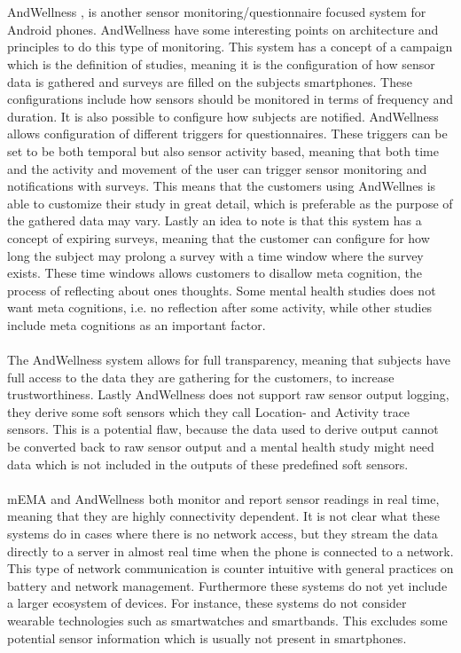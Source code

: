 \\\\
AndWellness \parencite{hicks2010andwellness}, is another sensor monitoring/questionnaire focused system for Android phones. AndWellness have some interesting points on architecture and principles to do this type of monitoring. This system has a concept of a campaign which is the definition of studies, meaning it is the configuration of how sensor data is gathered and surveys are filled on the subjects smartphones. These configurations include how sensors should be monitored in terms of frequency and duration. It is also possible to configure how subjects are notified. AndWellness allows configuration of different triggers for questionnaires. These triggers can be set to be both temporal but also sensor activity based, meaning that both time and the activity and movement of the user can trigger sensor monitoring and notifications with surveys. This means that the customers using AndWellnes is able to customize their study in great detail, which is preferable as the purpose of the gathered data may vary. Lastly an idea to note is that this system has a concept of expiring surveys, meaning that the customer can configure for how long the subject may prolong a survey with a time window where the survey exists. These time windows allows customers to disallow meta cognition, the process of reflecting about ones thoughts. Some mental health studies does not want meta cognitions, i.e. no reflection after some activity, while other studies include meta cognitions as an important factor. 
\\\\
The AndWellness system allows for full transparency, meaning that subjects have full access to the data they are gathering for the customers, to increase trustworthiness. Lastly AndWellness does not support raw sensor output logging, they derive some soft sensors which they call Location- and Activity trace sensors. This is a potential flaw, because the data used to derive output cannot be converted back to raw sensor output and a mental health study might need data which is not included in the outputs of these predefined soft sensors.
\\\\
mEMA and AndWellness both monitor and report sensor readings in real time, meaning that they are highly connectivity dependent. It is not clear what these systems do in cases where there is no network access, but they stream the data directly to a server in almost real time when the phone is connected to a network. This type of network communication is counter intuitive with general practices on battery and network management. Furthermore these systems do not yet include a larger ecosystem of devices. For instance, these systems do not consider wearable technologies such as smartwatches and smartbands. This excludes some potential sensor information which is usually not present in smartphones.

